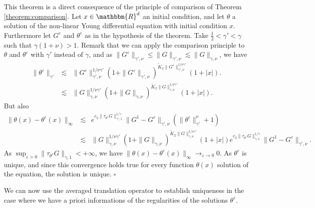 \documentclass[a4paper,11pt]{article}
\newenvironment{proof}{{\sc Proof.}}{\hfill$\square$}
\begin{document}
\begin{proof}
  This theorem is a direct consequence of the principle of comparison of
  Theorem \ref{theorem:comparison}. Let $x \in \mathbbm{R}^{d}$ an initial
  condition, and let $\theta$ a solution of the non-linear Young differential
  equation with initial condition $x$. Furthermore let $G^{\varepsilon}$ and
  $\theta^{\varepsilon}$ as in the hypothesis of the theorem. Take
  $\frac{1}{2} < \gamma' < \gamma$ such that $\gamma ( 1+ \nu ) >1$. Remark
  that we can apply the comparison principle to $\theta$ and
  $\theta^{\varepsilon}$ with $\gamma'$ instead of $\gamma$, and as $\|
  G^{\varepsilon} \|_{\gamma' , \nu} \leqslant \| G \|_{\gamma' , \nu}
  \lesssim \| G \|_{\gamma , \nu}$, we have
  \begin{eqnarray*}
    \| \theta^{\varepsilon} \|_{\gamma'} & \lesssim & \| G^{\varepsilon}
    \|_{\gamma' , \nu}^{1/ \nu \gamma'} ( 1+ \| G^{\varepsilon} \|_{\gamma' ,
    \nu} )^{\tilde{K}_{2} \| G^{\varepsilon} \|_{\gamma' , \nu}^{1/ \nu
    \gamma'}} ( 1+ | x | ) .\\
    & \lesssim & \| G \|_{\gamma , \nu}^{1/ \nu \gamma'} ( 1+ \| G \|_{\gamma
    , \nu} )^{\tilde{K}_{2} \| G \|_{\gamma , \nu}^{1/ \nu \gamma'}} ( 1+ | x
    | ) .
  \end{eqnarray*}
  But also
  \begin{eqnarray*}
    \| \theta ( x ) - \theta^{\varepsilon} ( x ) \|_{\infty} & \lesssim &
    e^{c_{2} \| \tau_{\theta^{\varepsilon}} G \|_{\gamma' ,1}^{1/ \gamma}} \|
    G^{1} -G^{\varepsilon} \|_{\gamma' , \nu} ( \| \theta^{\varepsilon}
    \|^{\nu}_{\gamma'} +1 )\\
    & \lesssim & \| G \|_{\gamma , \nu}^{1/ \nu \gamma'} ( 1+ \| G \|_{\gamma
    , \nu} )^{\tilde{K}_{2} \| G \|_{\gamma , \nu}^{1/ \nu \gamma'}} ( 1+ | x
    | ) e^{c_{2} \| \tau_{\theta^{\varepsilon}} G \|_{\gamma ,1}^{1/ \gamma}}
    \| G^{1} -G^{\varepsilon} \|_{\gamma' , \nu} .
  \end{eqnarray*}
  As $\sup_{\varepsilon >0} \| \tau_{\theta^{\varepsilon}} G \|_{\gamma ,1} <+
  \infty$, we have $\| \theta ( x ) - \theta^{\varepsilon} ( x ) \|_{\infty}
  \rightarrow_{\varepsilon \rightarrow 0} 0$. As $\theta^{\varepsilon}$ is
  unique, and since this convergence holds true for every function $\theta ( x
  )$ solution of the equation, the solution is unique.
\end{proof}

We can now use the averaged translation operator to establish uniqueness in
the case where we have a priori informations of the regularities of the
solutions $\theta^{\varepsilon}$.
\end{document}
